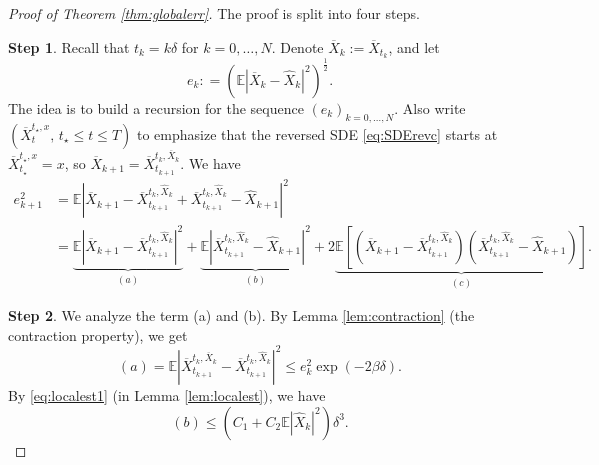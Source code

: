 \documentclass[letterpaper,11pt,reqno]{amsart}
\numberwithin{equation}{section}
\begin{document}
\begin{proof}[Proof of Theorem \ref{thm:globalerr}]
The proof is split into four steps.

\smallskip
{\bf Step 1}. Recall that $t_k = k \delta$ for $k = 0, \ldots, N$.
Denote $\overline{X}_k:=\overline{X}_{t_k}$,
and let 
\begin{equation*}
e_k: = \left(\mathbb{E}|\overline{X}_k - \widehat{X}_k|^2 \right)^{\frac{1}{2}}.
\end{equation*}
The idea is to build a recursion for the sequence $(e_k)_{k = 0, \ldots, N}$.
Also write $(\overline{X}^{t_\star, x}_t, \, t_\star \le t \le T)$ to emphasize that
the reversed SDE \eqref{eq:SDErevc} starts at $\overline{X}^{t_\star, x}_{t_\star} = x$,
so $\overline{X}_{k+1} = \overline{X}^{t_k, \overline{X}_k}_{t_{k+1}}$.
We have
\begin{equation}
\label{eq:decompabc}
\begin{aligned}
e_{k+1}^2 & = \mathbb{E}\left|\overline{X}_{k+1} - \overline{X}_{t_{k+1}}^{t_k, \widehat{X}_k} +  \overline{X}_{t_{k+1}}^{t_k, \widehat{X}_k}- \widehat{X}_{k+1} \right|^2 \\
& = \underbrace{\mathbb{E}|\overline{X}_{k+1} - \overline{X}_{t_{k+1}}^{t_k, \widehat{X}_k}|^2}_{(a)} + \underbrace{\mathbb{E}|\overline{X}_{t_{k+1}}^{t_k, \widehat{X}_k}- \widehat{X}_{k+1}|^2}_{(b)} + 2 \underbrace{\mathbb{E}\left[ (\overline{X}_{k+1} - \overline{X}_{t_{k+1}}^{t_k, \widehat{X}_k}) (\overline{X}_{t_{k+1}}^{t_k, \widehat{X}_{k}}- \widehat{X}_{k+1})\right]}_{(c)}.
\end{aligned}
\end{equation}

{\bf Step 2}. We analyze the term (a) and (b). 
By Lemma \ref{lem:contraction} (the contraction property), 
we get
\begin{equation}
\label{eq:terma1}
(a) = \mathbb{E}|\overline{X}_{t_{k+1}}^{t_k, \overline{X}_k} - \overline{X}_{t_{k+1}}^{t_k, \widehat{X}_k}|^2 \le e_k^2 \exp(- 2 \beta \delta).
\end{equation}
By \eqref{eq:localest1} (in Lemma \ref{lem:localest}), we have
\begin{equation}
\label{eq:termb1}
(b) \le \left(C_1 + C_2 \mathbb{E}|\widehat{X}_k|^2 \right) \delta^3.
\end{equation}


\end{proof}
\end{document}
